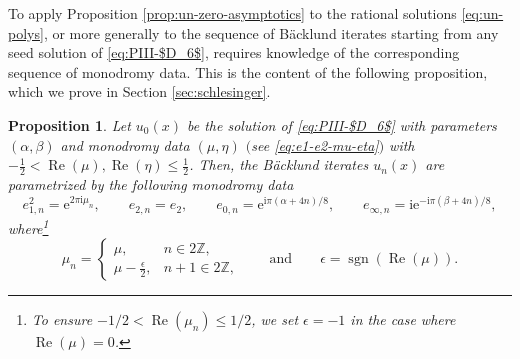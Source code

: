 \documentclass[11pt]{article}
\numberwithin{equation}{section}
\numberwithin{equation}{section}
\newtheorem{prop}[Theorem]{Proposition}
 { \theoremstyle{definition}
\newtheorem{Definition}[Theorem]{Definition}
\newtheorem{Note}[Theorem]{Note}
\newtheorem{Example}[Theorem]{Example}
\newtheorem{Remark}[Theorem]{Remark} }
\newcommand{\ee}{\mathrm{e}}
\newcommand{\ii}{\mathrm{i}}
\newcommand{\Z}{{\mathbb{Z}}}
\newcommand{\re}{\operatorname{Re}}
\newcommand{\sgn}{\operatorname{sgn}}
\begin{document}
To apply Proposition \ref{prop:un-zero-asymptotics} to the rational solutions \eqref{eq:un-polys}, or more generally to the sequence of B\"acklund iterates starting from any seed solution of \eqref{eq:PIII-$D_6$}, requires knowledge of the corresponding sequence of monodromy data. This is the content of the following proposition, which we prove in Section \ref{sec:schlesinger}.
\begin{prop}\label{prop:schlesinger}
Let $u_0(x)$ be the solution of \eqref{eq:PIII-$D_6$} with parameters $(\alpha,\beta)$ and monodromy data $(\mu,\eta)$ $($see \eqref{eq:e1-e2-mu-eta}$)$ with $-\frac{1}{2}<\re (\mu), \re(\eta)\le\frac{1}{2}$. Then, the B\"acklund iterates $u_n(x)$ are parametrized by the following monodromy data
\[
e^2_{1, n} = \ee^{2\pi \ii \mu_n} ,\qquad e_{2, n} = e_2, \qquad e_{0,n}=\ee^{{\ii\pi(\alpha+4n)}/{8}}, \qquad e_{\infty,n}=\ii\ee^{-{\ii\pi(\beta+4n)}/{8}}, \]
where\footnote{To ensure $-1/2<\re(\mu_n)\leq 1/2$, we set $\epsilon = -1$ in the case where $\re(\mu) = 0$.}
\[
\mu_n = \begin{cases} \mu, & n \in 2\Z, \\ \mu - \frac{\epsilon}{2}, & n + 1 \in 2\Z, \end{cases} \qquad \text{and}\qquad \epsilon = \sgn (\re (\mu)).
\]
\end{prop}
\end{document}

